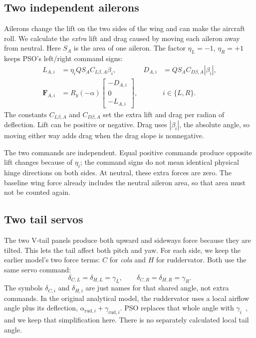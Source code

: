 \documentclass[11pt,a4paper]{article}
\numberwithin{equation}{section}
\newcommand{\vect}[1]{\boldsymbol{#1}}
\begin{document}
\subsection{Two independent ailerons}
Ailerons change the lift on the two sides of the wing and can make the
aircraft roll. We calculate the \emph{extra} lift and drag caused by moving
each aileron away from neutral. Here $S_A$ is the area of one aileron.
The factor $\eta_L=-1$, $\eta_R=+1$ keeps PSO's left/right command signs:
\begin{align}
 L_{A,i}&=\eta_i QS_A C_{L\beta,A}\beta_i,&
 D_{A,i}&=QS_A C_{D\beta,A}|\beta_i|,\label{eq:aileron-mag}\\
 \vect F_{A,i}&=R_y(-\alpha)
 \begin{bmatrix}-D_{A,i}\\0\\-L_{A,i}\end{bmatrix},&& i\in\{L,R\}.
 \label{eq:aileron-force}
\end{align}
The constants $C_{L\beta,A}$ and $C_{D\beta,A}$ set the extra lift and drag
per radian of deflection. Lift can be positive or negative. Drag uses
$|\beta_i|$, the absolute angle, so moving either way adds drag when the
drag slope is nonnegative.

The two commands are independent. Equal positive commands produce opposite
lift changes because of $\eta_i$; the command signs do not mean identical
physical hinge directions on both sides. At neutral, these extra forces are
zero. The baseline wing force already includes the neutral aileron area,
so that area must not be counted again.

\subsection{Two tail servos}
The two V-tail panels produce both upward and sideways force because they
are tilted. This lets the tail affect both pitch and yaw.
For each side, we keep the earlier model's two force terms: $C$ for
\emph{cola} and $H$ for ruddervator. Both use the same servo command:
\begin{equation}\label{eq:tail-coupling}
 \delta_{C,L}=\delta_{H,L}=\gamma_L,\qquad
 \delta_{C,R}=\delta_{H,R}=\gamma_R.
\end{equation}
The symbols $\delta_{C,i}$ and $\delta_{H,i}$ are just names for that shared
angle, not extra commands. In the original analytical model, the ruddervator
uses a local airflow angle plus its deflection,
$\alpha_{\mathrm{rud},i}+\gamma_{\mathrm{rud},i}$.
PSO replaces that whole angle with $\gamma_i$~\cite{pso}, and we keep that
simplification here. There is no separately calculated local tail angle.
\end{document}
